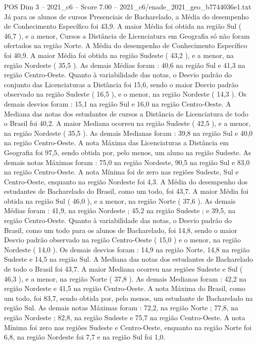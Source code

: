 \begin{textsample}{POS Dim 3 – 2021\_c6 – Score 7.00 – 2021\_c6/enade\_2021\_geo\_b7744036e1.txt}
Já para os alunos de cursos Presenciais de Bacharelado, a Média do desempenho de Conhecimento Específico foi 43,9.
A maior Média foi obtida na região Sul ( 46,7 ), e a menor, Cursos a Distância de Licenciatura em Geografia só não foram ofertados na região Norte.
A Média do desempenho de Conhecimento Específico foi 40,9.
A maior Média foi obtida na região Sudeste ( 43,2 ), e a menor, na região Nordeste ( 35,5 ).
As demais Médias foram : 40,6 na região Sul e 41,3 na região Centro-Oeste.
Quanto à variabilidade das notas, o Desvio padrão do conjunto das Licenciaturas a Distância foi 15,6, sendo o maior Desvio padrão observado na região Sudeste ( 16,5 ), e o menor, na região Nordeste ( 14,3 ).
Os demais desvios foram : 15,1 na região Sul e 16,0 na região Centro-Oeste.
A Mediana das notas dos estudantes de cursos a Distância de Licenciatura de todo o Brasil foi 40,2.
A maior Mediana ocorreu na região Sudeste ( 42,5 ), e a menor, na região Nordeste ( 35,5 ).
As demais Medianas foram : 39,8 na região Sul e 40,0 na região Centro-Oeste.
A nota Máxima das Licenciaturas a Distância em Geografia foi 97,5, sendo obtida por, pelo menos, um aluno na região Sudeste.
As demais notas Máximas foram : 75,0 na região Nordeste, 90,5 na região Sul e 83,0 na região Centro-Oeste.
A nota Mínima foi de zero nas regiões Sudeste, Sul e Centro-Oeste, enquanto na região Nordeste foi 4,3.
A Média do desempenho dos estudantes de Bacharelado do Brasil, como um todo, foi 43,7.
A maior Média foi obtida na região Sul ( 46,0 ), e a menor, na região Norte ( 37,6 ).
As demais Médias foram : 41,9, na região Nordeste ; 45,2 na região Sudeste ; e 39,5, na região Centro-Oeste.
Quanto à variabilidade das notas, o Desvio padrão do Brasil, como um todo para os alunos de Bacharelado, foi 14,8, sendo o maior Desvio padrão observado na região Centro-Oeste ( 15,0 ) e o menor, na região Nordeste ( 14,0 ).
Os demais desvios foram : 14,9 na região Norte, 14,8 na região Sudeste e 14,5 na região Sul.
A Mediana das notas dos estudantes de Bacharelado de todo o Brasil foi 43,7.
A maior Mediana ocorreu nas regiões Sudeste e Sul ( 46,3 ), e a menor, na região Norte ( 37,8 ).
As demais Medianas foram : 42,2 na região Nordeste e 41,5 na região Centro-Oeste.
A nota Máxima do Brasil, como um todo, foi 83,7, sendo obtida por, pelo menos, um estudante de Bacharelado na região Sul.
As demais notas Máximas foram : 72,2, na região Norte ; 77,8, na região Nordeste ; 82,8, na região Sudeste e 75,7 na região Centro-Oeste.
A nota Mínima foi zero nas regiões Sudeste e Centro-Oeste, enquanto na região Norte foi 6,8, na região Nordeste foi 7,7 e na região Sul foi 1,0.

\end{textsample}
